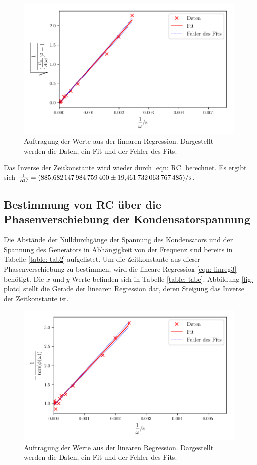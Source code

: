 \begin{figure}
  \centering
  \includegraphics{build/plotb.pdf}
  \caption{Auftragung der Werte aus der linearen Regression. Dargestellt werden die Daten, ein Fit und der Fehler des Fits.}
  \label{fig:plotb}
\end{figure}

Das Inverse der Zeitkonstante wird wieder durch \eqref{eqn: RC} berechnet. Es ergibt sich %
$\frac{1}{RC} = \SI{885.6821479847594  \pm 19.461732063767485}{\per\second}$.

\subsection{Bestimmung von RC über die Phasenverschiebung der Kondensatorspannung}
Die Abstände der Nulldurchgänge der Spannung des Kondensators und der Spannung des Generators in Abhängigkeit
von der Frequenz sind bereits in Tabelle \ref{table: tab2} aufgelistet.
Um die Zeitkonstante aus dieser Phasenverschiebung zu bestimmen, wird die lineare Regression \eqref{eqn: linreg3} benötigt.
Die $x$ und $y$ Werte befinden sich in Tabelle \ref{table: tabc}. Abbildung \ref{fig: plotc} stellt die Gerade der
linearen Regression dar, deren Steigung das Inverse der Zeitkonstante ist.


\begin{figure}
  \centering
  \includegraphics{build/plotc.pdf}
  \caption{Auftragung der Werte aus der linearen Regression. Dargestellt werden die Daten, ein Fit und der Fehler des Fits.}
  \label{fig:plotc}
\end{figure}

